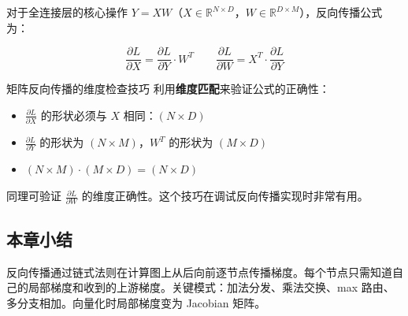 对于全连接层的核心操作 $Y = XW$（$X \in \mathbb{R}^{N \times D}$，$W \in \mathbb{R}^{D \times M}$），反向传播公式为：

$$\frac{\partial L}{\partial X} = \frac{\partial L}{\partial Y} \cdot W^T \qquad \frac{\partial L}{\partial W} = X^T \cdot \frac{\partial L}{\partial Y}$$

\begin{importantbox}{矩阵反向传播的维度检查技巧}
利用\textbf{维度匹配}来验证公式的正确性：
\begin{itemize}
    \item $\frac{\partial L}{\partial X}$ 的形状必须与 $X$ 相同：$(N \times D)$
    \item $\frac{\partial L}{\partial Y}$ 的形状为 $(N \times M)$，$W^T$ 的形状为 $(M \times D)$
    \item $(N \times M) \cdot (M \times D) = (N \times D)$ \checkmark
\end{itemize}
同理可验证 $\frac{\partial L}{\partial W}$ 的维度正确性。这个技巧在调试反向传播实现时非常有用。
\end{importantbox}

\subsection{本章小结}

反向传播通过链式法则在计算图上从后向前逐节点传播梯度。每个节点只需知道自己的局部梯度和收到的上游梯度。关键模式：加法分发、乘法交换、max 路由、多分支相加。向量化时局部梯度变为 Jacobian 矩阵。


